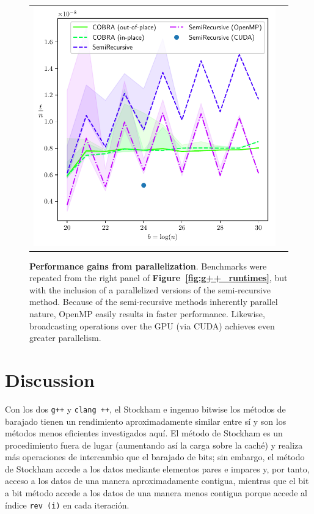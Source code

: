 ﻿\documentclass[10pt]{article}
\begin{document}
{\begin{figure}[ht!]
\centering
\begin{tabular}{cc}
  \includegraphics[width=6in]{results/open_mp_performance.pdf}
\end{tabular}
\caption{{\bf Performance gains from parallelization}. Benchmarks were
  repeated from the right panel of {\bf
    Figure~\ref{fig:g++_runtimes}}, but with the inclusion of a
  parallelized versions of the semi-recursive method. Because of the
  semi-recursive methods inherently parallel nature, OpenMP easily
  results in faster performance. Likewise, broadcasting operations
  over the GPU (via CUDA) achieves even greater parallelism.
  \label{fig:g++_parallel_runtimes}
}
\end{figure}

\section*{Discussion}
Con los dos {\tt g++} y {\tt clang ++}, el Stockham e ingenuo bitwise los métodos de barajado tienen un rendimiento aproximadamente similar entre sí y son los métodos menos eficientes investigados aquí. El método de Stockham
es un procedimiento fuera de lugar (aumentando así la carga sobre la caché)
y realiza más operaciones de intercambio que el barajado de bits; sin embargo, el método de Stockham accede a los datos mediante elementos pares e impares y, por tanto, acceso a los datos de una manera aproximadamente contigua, mientras que el bit a bit método accede a los datos de una manera menos contigua porque accede al índice {\tt rev (i)} en cada iteración.

}
\end{document}
